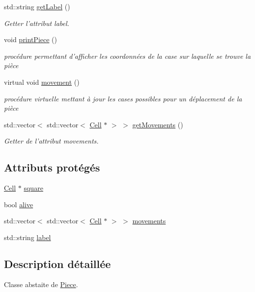 \begin{DoxyCompactItemize}
std\-::string \hyperlink{class_piece_ab0b61a2a0f2f3d977b4b1946ab328f2b}{get\-Label} ()
\begin{DoxyCompactList}\small\item\em Getter l'attribut label. \end{DoxyCompactList}\item 
void \hyperlink{class_piece_ae9c47c1e15caf3ecf060c274aec62820}{print\-Piece} ()
\begin{DoxyCompactList}\small\item\em procédure permettant d'afficher les coordonnées de la case sur laquelle se trouve la pièce \end{DoxyCompactList}\item 
virtual void \hyperlink{class_piece_ae721b5ed94376fd4e7d348d36739ed4d}{movement} ()
\begin{DoxyCompactList}\small\item\em procédure virtuelle mettant à jour les cases possibles pour un déplacement de la pièce \end{DoxyCompactList}\item 
std\-::vector$<$ std\-::vector$<$ \hyperlink{class_cell}{Cell} $\ast$ $>$ $>$ \hyperlink{class_piece_af2a3be14e4732ac3f09a84a9cbefbf5b}{get\-Movements} ()
\begin{DoxyCompactList}\small\item\em Getter de l'attribut movements. \end{DoxyCompactList}\end{DoxyCompactItemize}
\subsection*{Attributs protégés}
\begin{DoxyCompactItemize}
\item 
\hyperlink{class_cell}{Cell} $\ast$ \hyperlink{class_piece_a1e38a3d73f5f7171eca664a77c7aaeff}{square}
\item 
bool \hyperlink{class_piece_a8b3c2f812ead74ba513f521e63f767f9}{alive}
\item 
std\-::vector$<$ std\-::vector$<$ \hyperlink{class_cell}{Cell} $\ast$ $>$ $>$ \hyperlink{class_piece_a022b28159d944243023804a678d7024f}{movements}
\item 
std\-::string \hyperlink{class_piece_aec026f7ca20120f0b635591de2f86662}{label}
\end{DoxyCompactItemize}


\subsection{Description détaillée}
Classe abstaite de \hyperlink{class_piece}{Piece}. 


